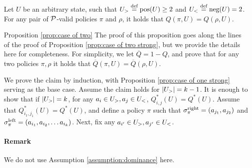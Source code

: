 \begin{proposition}\label{prop:case of two}
Let $U$ be an arbitrary state, such that $U_>\stackrel{\text{def}}{=}\textnormal{pos}(U)\geq 2$ and $U_<\stackrel{\text{def}}{=}\textnormal{neg}(U) = 2$. For any pair of $\mathcal{P}$-valid policies $\pi$ and $\rho$, it holds that $Q(\pi,U)=Q(\rho,U)$.
\end{proposition}
\begin{proofof}{Proposition \ref{prop:case of two}}
The proof of this proposition goes along the lines of the proof of Proposition \ref{prop:case of two strong}, but we provide the details here for completeness. For simplicity, we let $\overline Q = 1-Q$, and prove that for any two policies $\pi, \rho$ it holds that $\overline Q(\pi,U)=\overline Q(\rho,U)$.

We prove the claim by induction, with Proposition \ref{prop:case of one strong} serving as the base case. Assume the claim holds for $\left| U_> \right|=k-1$. It is enough to show that if $\left| U_> \right|=k$, for any $a_i\in U_>,a_j\in U_<$, $Q^*_{i,j}(U)=Q^*(U)$. Assume that $Q^*_{{i_1},{j_1}}(U)=Q^*(U)$, and define a policy $\pi$ such that $\sigma^{\textnormal{right}}_\pi=(a_{j_1},a_{j_2})$ and $\sigma^{\textnormal{left}}_\pi=(a_{i_1},a_{i_2},\dots a_{i_k})$. Next, fix any $a_{i'}\in U_>, a_{j'}\in U_<$. 
\paragraph{Remark} We do not use Assumption \ref{assumption:dominance} here.

\end{proofof}
